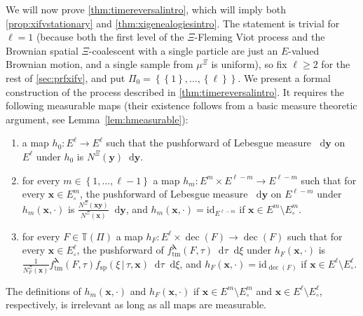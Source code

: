\documentclass[reqno,draft]{amsart}
\numberwithin{equation}{section}
\theoremstyle{plain}
\theoremstyle{remark}
\newcommand*\diff{\mathop{}\!\mathrm{d}}
\newcommand{\id}{\mathrm{id}}
\newcommand{\fpart}{\Pi} %
\DeclareMathOperator{\nd}{nd}
\DeclareMathOperator{\dcb}{dec}
\DeclareMathOperator{\dct}{tm}
\DeclareMathOperator{\dcs}{sp}
\newcommand{\ftm}{f_\mathrm{tm}^{\boldsymbol \lambda}}
\newcommand{\fsp}{f_\mathrm{sp}}
\begin{document}
We will now prove \cref{thm:timereversalintro}, which will imply both \cref{prop:xifvstationary} and \cref{thm:xigenealogiesintro}. The statement is trivial for $\ell = 1$ (because both the first level of the $\Xi$-Fleming Viot process and the Brownian spatial $\Xi$-coalescent with a single particle are just an $E$-valued Brownian motion, and a single sample from $\mu^\Xi$ is uniform), so fix $\ell\ge 2$ for the rest of \cref{sec:prfxifv}, and put $\fpart_0 = \left\{ \left\{ 1 \right\} , \ldots ,\left\{ \ell \right\}  \right\} $. We present a formal construction of the process described in \cref{thm:timereversalintro}. It requires the following measurable maps (their existence follows from a basic measure theoretic argument, see Lemma~\ref{lem:hmeasurable}):
\begin{enumerate}
    \item a map $h_0\colon E^\ell  \to E^\ell $ such that the pushforward of Lebesgue measure $\diff \boldsymbol y$ on $E^\ell$ under $h_0$ is $N^\Xi(\boldsymbol y)\diff \boldsymbol y$.
    \item for every $m \in \left\{ 1, \ldots ,\ell-1 \right\} $ a map $h_m \colon E^m \times E^{\ell-m} \to E^{\ell-m}$ such that for every $\boldsymbol x\in E^m_\circ $, the pushforward of Lebesgue measure $\diff \boldsymbol y$ on $E^{\ell-m}$ under $h_m(\boldsymbol x,\cdot )$ is $\frac{N^\Xi(\boldsymbol x\boldsymbol y)}{N^\Xi(\boldsymbol x)} \diff \boldsymbol y$, and $h_m(\boldsymbol x,\cdot ) = \id_{E^{\ell-m}}$ if $\boldsymbol x\in E^m \setminus E^m_\circ $.
    \item for every $F\in \mathbb{T}(\fpart)$ a map $h_F\colon E^\ell  \times \dcb(F) \to \dcb(F)$ such that for every $\boldsymbol x\in E^\ell_\circ $, the pushforward of $\ftm(F,\tau) \diff \tau \diff \xi$ under $h_F(\boldsymbol x,\cdot )$ is $\frac{1}{N^\Xi_F(\boldsymbol x)} \ftm(F,\tau) \fsp(\xi \,\vert\,\tau,\boldsymbol x) \diff \tau \diff \xi$, and $h_F(\boldsymbol x,\cdot ) = \id_{\dcb(F)}$ if $\boldsymbol x\in E^\ell \setminus E^\ell_\circ $.
\end{enumerate}
The definitions of $h_m(\boldsymbol x,\cdot )$ and $h_F(\boldsymbol x,\cdot )$ if $\boldsymbol x\in E^m\setminus E^m_\circ $ and $\boldsymbol x\in E^\ell\setminus E^\ell_\circ $, respectively, is irrelevant as long as all maps are measurable.

\end{document}
